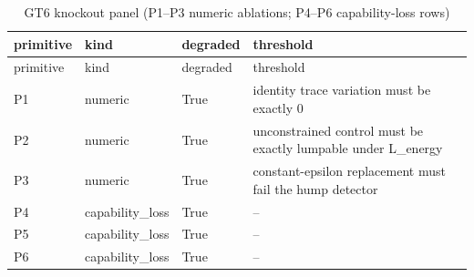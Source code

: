 \begin{longtable}{lllp{6.5cm}}
\caption{GT6 knockout panel (P1--P3 numeric ablations; P4--P6 capability-loss rows)}\label{tab:gt6-knockouts} \\
\toprule
primitive & kind & degraded & threshold \\
\midrule
\endfirsthead
\toprule
primitive & kind & degraded & threshold \\
\midrule
\endhead
\bottomrule
\endfoot
P1 & numeric & True & identity trace variation must be exactly 0 \\
P2 & numeric & True & unconstrained control must be exactly lumpable under L\_energy \\
P3 & numeric & True & constant-epsilon replacement must fail the hump detector \\
P4 & capability\_loss & True & -- \\
P5 & capability\_loss & True & -- \\
P6 & capability\_loss & True & -- \\
\bottomrule
\end{longtable}

